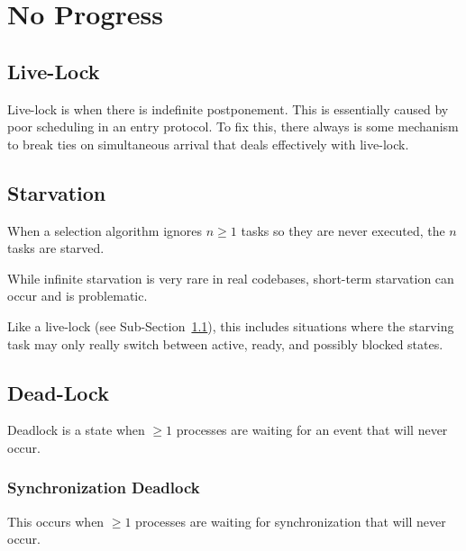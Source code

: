         \section{No Progress} %
        \label{sec:no_progress}
            \subsection{Live-Lock} %
            \label{sub:live_lock}
                Live-lock is when there is indefinite postponement.
                This is essentially caused by poor scheduling in an entry protocol.
                To fix this, there always is some mechanism to break ties on simultaneous arrival that deals effectively with live-lock.
            \subsection{Starvation} %
            \label{sub:starvation}
                When a selection algorithm ignores $n\ge1$ tasks so they are never executed, the $n$ tasks are starved.

                While infinite starvation is very rare in real codebases, short-term starvation can occur and is problematic.

                Like a live-lock (see Sub-Section~\ref{sub:live_lock}), this includes situations where the starving task may only really switch between active, ready, and possibly blocked states.
            \subsection{Dead-Lock} %
            \label{sub:dead_lock}
                Deadlock is a state when $\ge1$ processes are waiting for an event that will never occur.
                \subsubsection{Synchronization Deadlock} %
                \label{ssub:synchronization_deadlock}
                    This occurs when $\ge1$ processes are waiting for synchronization that will never occur.
